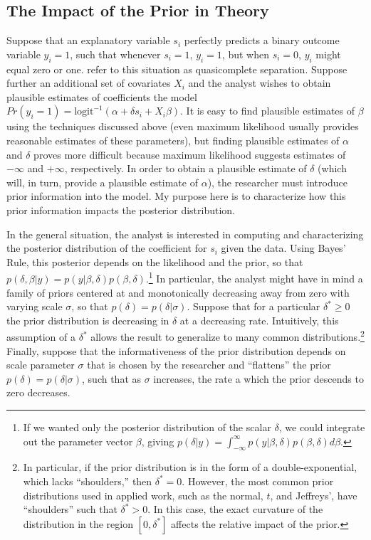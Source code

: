 \documentclass[12pt]{article}
\begin{document}
\subsection*{The Impact of the Prior in Theory}

Suppose that an explanatory variable $s_i$ perfectly predicts a binary outcome variable $y_i = 1$, such that whenever $s_i = 1$, $y_i = 1$, but when $s_i = 0$, $y_i$ might equal zero or one. \cite{AlbertAnderson1984} refer to this situation as quasicomplete separation. Suppose further an additional set of covariates $X_i$ and the analyst wishes to obtain plausible estimates of coefficients the model $Pr(y_i =1) = \text{logit}^{-1}(\alpha + \delta s_i + X_i \beta)$. It is easy to find plausible estimates of $\beta$ using the techniques discussed above (even maximum likelihood usually provides reasonable estimates of these parameters), but finding plausible estimates of $\alpha$ and $\delta$ proves more difficult because maximum likelihood suggests estimates of $-\infty$ and $+\infty$, respectively. In order to obtain a plausible estimate of $\delta$ (which will, in turn, provide a plausible estimate of $\alpha$), the researcher must introduce prior information into the model. My purpose here is to characterize how this prior information impacts the posterior distribution.

In the general situation, the analyst is interested in computing and characterizing the posterior distribution of the coefficient for $s_i$ given the data. Using Bayes' Rule, this posterior depends on the likelihood and the prior, so that $p(\delta, \beta | y) = p(y|\beta, \delta)p(\beta, \delta)$.\footnote{If we wanted only the posterior distribution of the scalar $\delta$, we could integrate out the parameter vector $\beta$, giving $p(\delta | y) = \int_{-\infty}^{\infty} p(y|\beta, \delta)p(\beta, \delta)d\beta$.} In particular, the analyst might have in mind a family of priors centered at and monotonically decreasing away from zero with varying scale $\sigma$, so that $p(\delta) = p(\delta | \sigma)$. Suppose that for a particular $\delta^* \geq 0$ the prior distribution is decreasing in $\delta$ at a decreasing rate. Intuitively, this assumption of a $\delta^*$ allows the result to generalize to many common distributions.\footnote{In particular, if the prior distribution is in the form of a double-exponential, which lacks ``shoulders,'' then $\delta^* = 0$. However, the most common prior distributions used in applied work, such as the normal, $t$, and Jeffreys', have ``shoulders'' such that $\delta^* > 0$. In this case, the exact curvature of the distribution in the region $[0, \delta^*]$ affects the relative impact of the prior.} 
Finally, suppose that the informativeness of the prior distribution depends on scale parameter $\sigma$ that is chosen by the researcher and ``flattens'' the prior $p(\delta) = p(\delta | \sigma)$, such that as $\sigma$ increases, the rate a which the prior descends to zero decreases.
\end{document}
